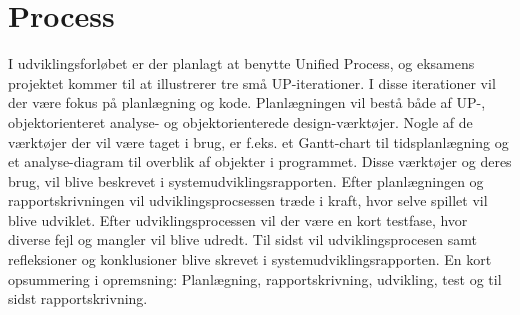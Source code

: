 \section{Process}
I udviklingsforløbet er der planlagt at benytte Unified Process, og eksamens projektet kommer til at illustrerer tre små UP-iterationer. 
I disse iterationer vil der være fokus på planlægning og kode. Planlægningen vil bestå både af UP-, objektorienteret analyse- og objektorienterede design-værktøjer. Nogle af de værktøjer der vil være taget i brug, er f.eks. et Gantt-chart til tidsplanlægning og et analyse-diagram til overblik af objekter i programmet. Disse værktøjer og deres brug, vil blive beskrevet i systemudviklingsrapporten. Efter planlægningen og rapportskrivningen vil udviklingsprocsessen træde i kraft, hvor selve spillet vil blive udviklet. Efter udviklingsprocessen vil der være en kort testfase, hvor diverse fejl og mangler vil blive udredt. Til sidst vil udviklingsprocesen samt refleksioner og konklusioner blive skrevet i systemudviklingsrapporten. En kort opsummering i opremsning: Planlægning, rapportskrivning, udvikling, test og til sidst rapportskrivning.
